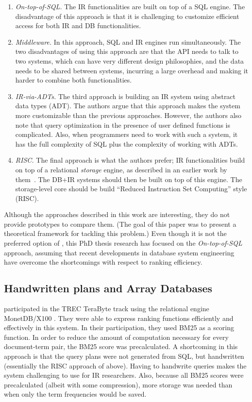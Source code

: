 \begin{enumerate}
	\item \emph{On-top-of-SQL.} The IR functionalities are built on top of a SQL engine. The disadvantage of this approach is that it is challenging to customize efficient access for both IR and DB functionalities. 
	\item \emph{Middleware.} In this approach, SQL and IR engines run simultaneously. The two disadvantages of using this approach are that the API needs to talk to two systems, which can have very different design philosophies, and the data needs to be shared between systems, incurring a large overhead and making it harder to combine both functionalities. 
	\item \emph{IR-via-ADTs.} The third approach is building an IR system using abstract data types (ADT). The authors argue that this approach makes the system more customizable than the previous approaches. However, the authors also note that query optimization in the presence of user defined functions is complicated. Also, when programmers need to work with such a system, it has the full complexity of SQL plus the complexity of working with ADTs. 
	\item \emph{RISC.} The final approach is what the authors prefer; IR functionalities build on top of a relational \textit{storage} engine, as described in an earlier work by them~\citep{risc}. The DB+IR systems should then be built on top of this engine. The storage-level core should be build ``Reduced Instruction Set Computing'' style (RISC). 
\end{enumerate}  
Although the approaches described in this work are interesting, they do not provide prototypes to compare them. (The goal of this paper was to present a theoretical framework for tackling this problem.) Even though it is not the preferred option of \citeauthor{Chaudhuri2005IntegratingDA}, this PhD thesis research has focused on the \emph{On-top-of-SQL} approach, assuming that recent developments in database system engineering have overcome the shortcomings with respect to ranking efficiency.

\subsection{Handwritten plans and Array Databases}
 participated in the TREC TeraByte track using the relational engine MonetDB/X100 \citep{monetdb/x100}. They were able to express ranking functions efficiently and effectively in this system. In their participation, they used BM25 as a scoring function. In order to reduce the amount of computation necessary for every document-term pair, the BM25 score was precalculated. 
A shortcoming in this approach is that the query plans were not generated from SQL, but handwritten (essentially the RISC approach of above). Having to handwrite queries makes the system challenging to use for IR researchers. Also, because all BM25 scores were precalculated (albeit with some compression), more storage was needed than when only the term frequencies would be saved.

